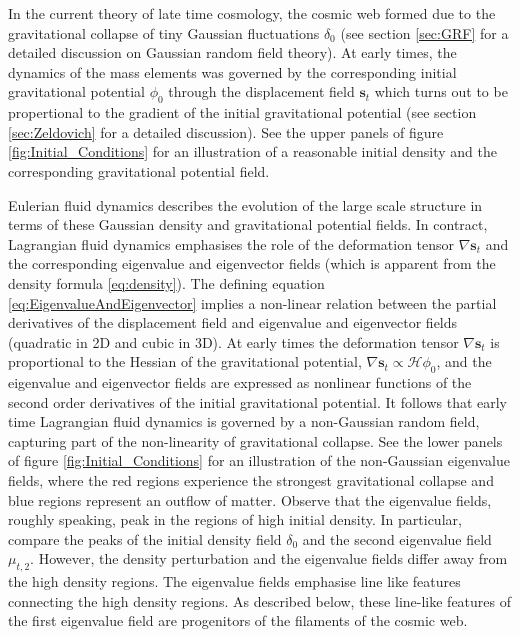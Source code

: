 \documentclass[a4paper, 11pt]{article}
\begin{document}
In the current theory of late time cosmology, the cosmic web formed due to the gravitational collapse of tiny Gaussian fluctuations $\delta_0$ (see section \ref{sec:GRF} for a detailed discussion on Gaussian random field theory). At early times, the dynamics of the mass elements was governed by the corresponding initial gravitational potential $\phi_0$ through the displacement field $\bm{s}_t$ which turns out to be propertional to the gradient of the initial gravitational potential (see section \ref{sec:Zeldovich} for a detailed discussion). See the upper panels of figure \ref{fig:Initial_Conditions} for an illustration of a reasonable initial density and the corresponding gravitational potential field. 

Eulerian fluid dynamics describes the evolution of the large scale structure in terms of these Gaussian density and gravitational potential fields. In contract, Lagrangian fluid dynamics emphasises the role of the deformation tensor $\nabla \bm{s}_t$ and the corresponding eigenvalue and eigenvector fields (which is apparent from the density formula \eqref{eq:density}). The defining equation \eqref{eq:EigenvalueAndEigenvector} implies a non-linear relation between the partial derivatives of the displacement field and eigenvalue and eigenvector fields (quadratic in 2D and cubic in 3D). At early times the deformation tensor $\nabla \bm{s}_t$ is proportional to the Hessian of the gravitational potential, $\nabla \bm{s}_t \propto \mathcal{H}\phi_0$, and the eigenvalue and eigenvector fields are expressed as nonlinear functions of the second order derivatives of the initial gravitational potential. It follows that early time Lagrangian fluid dynamics is governed by a non-Gaussian random field, capturing part of the non-linearity of gravitational collapse. See the lower panels of figure \ref{fig:Initial_Conditions} for an illustration of the non-Gaussian eigenvalue  fields, where the red regions experience the strongest gravitational collapse and blue regions represent an outflow of matter. Observe that the eigenvalue fields, roughly speaking, peak in the regions of high initial density. In particular, compare the peaks of the initial density field $\delta_0$ and the second eigenvalue field $\mu_{t,2}$. However, the density perturbation and the eigenvalue fields differ away from the high density regions. The eigenvalue fields emphasise line like features connecting the high density regions. As described below, these line-like features of the first eigenvalue field are progenitors of the filaments of the cosmic web.
\end{document}
